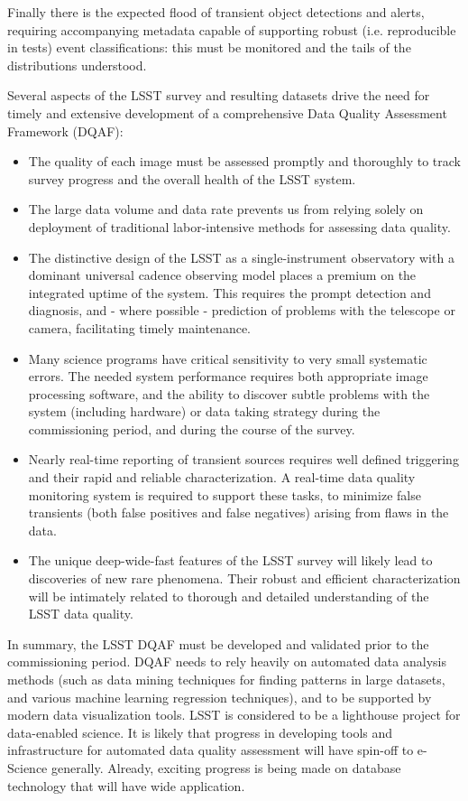 \documentclass[SE,toc,lsstdraft]{lsstdoc}
\begin{document}
Finally there is the expected flood of transient object detections and alerts, requiring accompanying metadata capable of supporting robust (i.e. reproducible in tests) event classifications: this must be monitored and the tails of the distributions understood.

Several aspects of the LSST survey and resulting datasets drive the need for timely and
extensive development of a comprehensive Data Quality Assessment Framework (DQAF):
\begin{itemize}
\item The quality of each image must be assessed promptly and thoroughly to track
         survey progress and the overall health of the LSST system.
\item The large data volume and data rate prevents us from relying solely on deployment of traditional
         labor-intensive methods for assessing data quality.
\item The distinctive design of the LSST as a single-instrument observatory with a dominant universal cadence observing     model places a premium on the integrated uptime of the system.  This requires the prompt detection and diagnosis, and - where possible - prediction of problems with the telescope or camera, facilitating timely maintenance.
\item Many science programs have critical sensitivity to very small systematic errors. The needed system
          performance requires both appropriate image processing software, and the ability
          to discover subtle problems with the system (including hardware) or data taking strategy during the
         commissioning period, and during the course of the survey.
\item Nearly real-time reporting of transient sources requires well defined triggering and their
          rapid and reliable characterization. A real-time data quality monitoring system is required to
          support these tasks, to minimize false transients (both false positives and false negatives) arising from flaws in the data.
\item The unique deep-wide-fast features of the LSST survey will likely lead to discoveries of
          new rare phenomena.  Their robust and efficient characterization will be intimately
          related to thorough and detailed understanding of the LSST data quality.
\end{itemize}

In summary, the LSST DQAF must be developed and validated prior to the commissioning
period. DQAF needs to rely heavily on automated data analysis methods (such as data mining
techniques for finding patterns in large datasets, and various machine learning regression
techniques), and to be supported by modern data visualization tools. LSST is considered to be a lighthouse project for data-enabled science.  It is likely that progress in developing tools and infrastructure for automated data quality assessment will have spin-off to e-Science generally. Already, exciting progress is being made on database technology that will have wide application.
\end{document}
